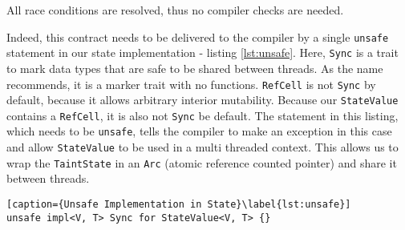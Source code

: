 All race conditions are resolved, thus no compiler checks are needed.

Indeed, this contract needs to be delivered to the compiler by a single \texttt{unsafe} statement in
our state implementation - listing \ref{lst:unsafe}. Here, \texttt{Sync} is a trait to mark data
types that are safe to be shared between threads. As the name recommends, it is a marker trait with
no functions. \texttt{RefCell} is not \texttt{Sync} by default, because it allows arbitrary interior
mutability. Because our \texttt{StateValue} contains a \texttt{RefCell}, it is also not
\texttt{Sync} be default. The statement in this listing, which needs to be \texttt{unsafe}, tells
the compiler to make an exception in this case and allow \texttt{StateValue} to be used in a multi
threaded context. This allows us to wrap the \texttt{TaintState} in an \texttt{Arc} (atomic
reference counted pointer) and share it between threads.

\begin{lstlisting}[caption={Unsafe Implementation in State}\label{lst:unsafe}]
unsafe impl<V, T> Sync for StateValue<V, T> {}
\end{lstlisting}

